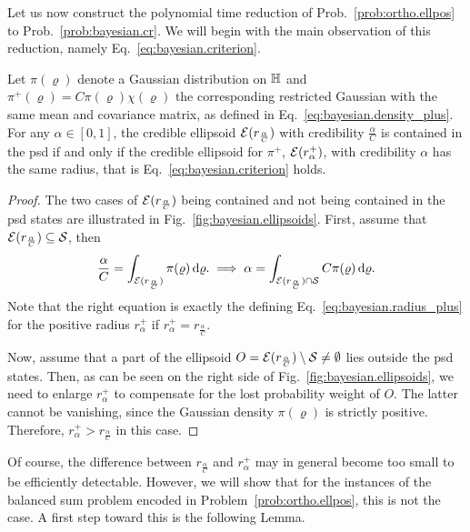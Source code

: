 Let us now construct the polynomial time reduction of Prob.~\ref{prob:ortho.ellpos} to Prob.~\ref{prob:bayesian.cr}.
We will begin with the main observation of this reduction, namely Eq.~\eqref{eq:bayesian.criterion}.
\begin{lemma}\label{lem:bayesian.criterion}
  Let $\pi(\varrho)$ denote a Gaussian distribution on $\mathbb{H}$ and $\pi^+(\varrho) = C \pi(\varrho) \chi(\varrho)$ the corresponding restricted Gaussian with the same mean and covariance matrix, as defined in Eq.~\eqref{eq:bayesian.density_plus}.
  For any $\alpha \in [0,1]$, the credible ellipsoid $\mathcal{E}(r_\frac{\alpha}{C})$ with credibility $\frac{\alpha}{C}$ is contained in the psd if and only if the credible ellipsoid for $\pi^+$, $\mathcal{E}(r^+_{\alpha})$, with credibility $\alpha$ has the same radius, that is Eq.~\eqref{eq:bayesian.criterion} holds.
\end{lemma}
\begin{proof}
  The two cases of  $\mathcal{E}(r_\frac{\alpha}{C})$ being contained and not being contained in the psd states are illustrated in Fig.~\ref{fig:bayesian.ellipsoids}.
  First, assume that $\mathcal{E}(r_\frac{\alpha}{C}) \subseteq \mathcal{S}$, then
  \begin{equation}
    \frac{\alpha}{C} = \int_{\mathcal{E}(r_\frac{\alpha}{C})} \pi(\varrho) \, \mathrm{d} \varrho.
    \implies
    \alpha = \int_{\mathcal{E}(r_\frac{\alpha}{C}) \cap \mathcal{S} } C \pi(\varrho) \, \mathrm{d} \varrho.
  \end{equation}
  Note that the right equation is exactly the defining Eq.~\eqref{eq:bayesian.radius_plus} for the positive radius $r^+_{\alpha}$ if $r^+_\alpha = r_\frac{\alpha}{C}$.

  Now, assume that a part of the ellipsoid $O = \mathcal{E}(r_\frac{\alpha}{C})  \setminus \mathcal{S} \neq \emptyset$ lies outside the psd states.
  Then, as can be seen on the right side of Fig.~\ref{fig:bayesian.ellipsoids}, we need to enlarge $r^+_{\alpha}$ to compensate for the lost probability weight of $O$.
  The latter cannot be vanishing, since the Gaussian density $\pi(\varrho)$ is strictly positive.
  Therefore, $r^+_\alpha > r_\frac{\alpha}{C}$ in this case.
\end{proof}
Of course, the difference between $r_\frac{\alpha}{C}$ and $r^+_{\alpha}$ may in general become too small to be efficiently detectable.
However, we will show that for the instances of the balanced sum problem encoded in Problem~\ref{prob:ortho.ellpos}, this is not the case.
A first step toward this is the following Lemma.

